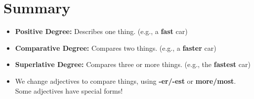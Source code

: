 \section{Summary}
\begin{summarybox}
    \begin{itemize}
        \item \textbf{Positive Degree:} Describes one thing. (e.g., a \textbf{fast} car)
        \item \textbf{Comparative Degree:} Compares two things. (e.g., a \textbf{faster} car)
        \item \textbf{Superlative Degree:} Compares three or more things. (e.g., the \textbf{fastest} car)
        \item We change adjectives to compare things, using \textbf{-er/-est} or \textbf{more/most}. Some adjectives have special forms!
    \end{itemize}
\end{summarybox}